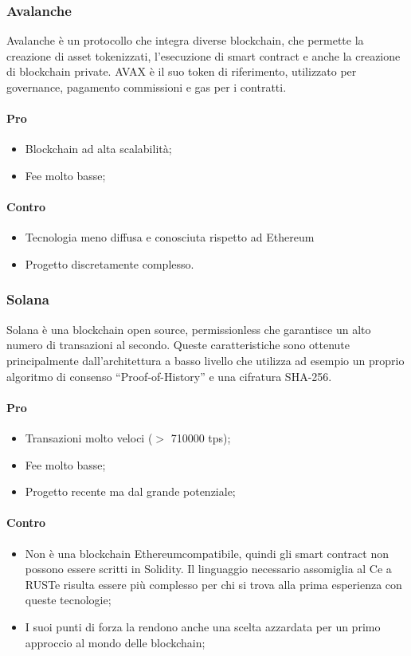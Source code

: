 		\subsubsection{Avalanche}
		Avalanche è un protocollo che integra diverse blockchain, che permette la creazione di asset tokenizzati, l'esecuzione di smart contract e anche la creazione di blockchain private. 
		AVAX è il suo token di riferimento, utilizzato per governance, pagamento commissioni e gas per i contratti.
		\paragraph{Pro}
		\begin{itemize}
			\item Blockchain ad alta scalabilità;
			\item Fee molto basse;
		\end{itemize}
		\paragraph{Contro}
		\begin{itemize}
			\item Tecnologia meno diffusa e conosciuta rispetto ad Ethereum\glo
			\item Progetto discretamente complesso.
		\end{itemize}
		
		\subsubsection{Solana}
		Solana è una blockchain open source\glo, permissionless che garantisce un alto numero di transazioni al secondo. Queste caratteristiche sono ottenute principalmente dall’architettura a basso livello
		che utilizza ad esempio un proprio algoritmo di consenso “Proof-of-History” e una cifratura SHA-256.
		\paragraph{Pro}
		\begin{itemize}
			\item Transazioni molto veloci ($>$ 710000 tps);
			\item Fee molto basse;
			\item Progetto recente ma dal grande potenziale;
		\end{itemize}
		\paragraph{Contro}
		\begin{itemize}
			\item Non è una blockchain Ethereum\glo compatibile, quindi gli smart contract non possono essere scritti in Solidity\glo. Il linguaggio necessario assomiglia al C\glo e a RUST\glo e risulta essere più complesso per chi si trova alla prima esperienza con queste tecnologie;
			\item I suoi punti di forza la rendono anche una scelta azzardata per un primo approccio al mondo delle blockchain;
		\end{itemize}
		
